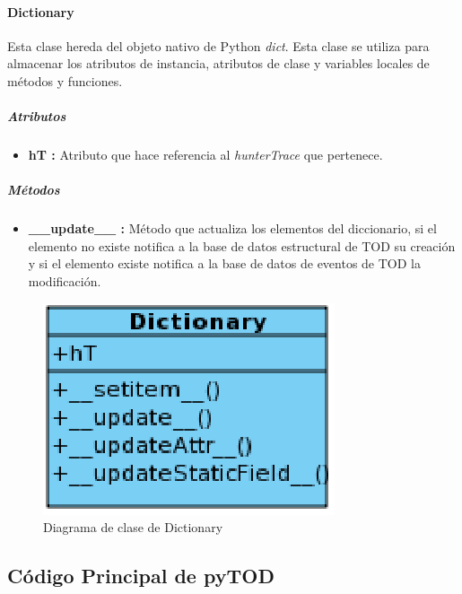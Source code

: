 \documentclass[12pt,legalpaper]{report}
\begin{document}
				\paragraph{Dictionary}
				
Esta clase hereda del objeto nativo de Python \textit{dict}.  Esta clase se utiliza para almacenar los atributos de instancia, atributos de clase y variables locales de métodos y funciones.										
					\subparagraph{Atributos}
					
\begin{itemize}
	\item \textbf{hT :} Atributo que hace referencia al \textit{hunterTrace} que pertenece. 
\end{itemize}					
					
					
					\subparagraph{Métodos}						
					
\begin{itemize}
	\item \textbf{\_\_update\_\_ :}  Método que actualiza los elementos del diccionario, si el elemento no existe notifica a la base de datos estructural de TOD su creación y si el elemento existe notifica a la base de datos de eventos de TOD la modificación.
\end{itemize}					
					
				
\begin{figure}[!h]
	\centering
	\includegraphics[scale=0.6]{images/Clases/Dictionary.eps}
	\caption{Diagrama de clase de Dictionary}
\end{figure}
					
		
		
		\subsection{Código Principal de pyTOD}
		
\end{document}
